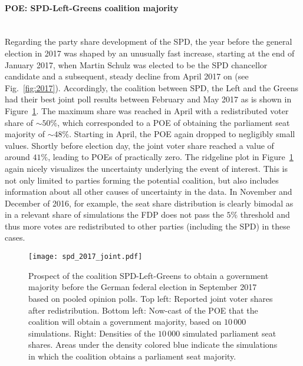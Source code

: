 \documentclass[smallextended]{svjour3}      %
\begin{document}
\paragraph{POE: SPD-Left-Greens coalition majority} \ \\
Regarding the party share development of the SPD, the year before
the general election in 2017 was shaped by an unusually fast increase, starting
at the end of January 2017, when Martin Schulz was elected to be the SPD chancellor
candidate and a subsequent, steady decline from April 2017 on (see Fig.~\ref{fig:2017}).
Accordingly, the coalition between SPD, the Left and the Greens had
their best joint poll results between February and May 2017 as is shown in
Figure~\ref{fig:2017_spdleftgreens}.
The maximum share was reached in April with a redistributed voter
share of $\sim 50\%$, which corresponded to a POE of obtaining the
parliament seat majority of $\sim 48\%$.
Starting in April, the POE again dropped to negligibly small values.
Shortly before election day, the joint voter share
reached a value of around $41\%$, leading to POEs of practically zero.
The ridgeline plot in Figure~\ref{fig:2017_spdleftgreens}
again nicely visualizes the uncertainty underlying the event of
interest. This is not only limited to parties forming the potential coalition,
but also includes information about all other causes of uncertainty in the data.
In November and December of 2016, for example, the seat share distribution
is clearly bimodal as in a relevant share of simulations the FDP does not
pass the $5\%$ threshold and thus more votes are redistributed to other parties
(including the SPD) in these cases.

\begin{figure}[H]\centering
\texttt{[image: spd\_2017\_joint.pdf]}
\caption{Prospect of the coalition SPD-Left-Greens to obtain a government majority before the
German federal election in September 2017 based on pooled opinion polls.
Top left: Reported joint voter shares after redistribution.
Bottom left: Now-cast of the POE that the coalition will obtain a government
majority, based on $10\,000$ simulations.
Right: Densities of the $10\,000$ simulated parliament seat shares. Areas under
the density colored blue indicate the simulations in which the coalition
obtains a parliament seat majority.
\label{fig:2017_spdleftgreens}
}
\end{figure}

\end{document}
